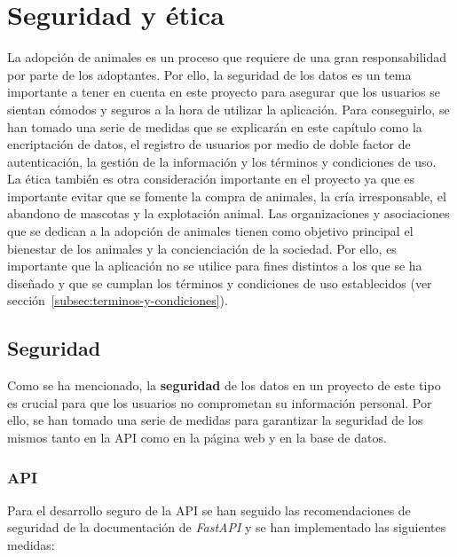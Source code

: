 \chapter{Seguridad y ética}\label{ch:seguridad-y-etica}

La adopción de animales es un proceso que requiere de una gran responsabilidad por parte de los adoptantes. Por ello,
la seguridad de los datos es un tema importante a tener en cuenta en este proyecto para asegurar que los usuarios
se sientan cómodos y seguros a la hora de utilizar la aplicación. Para conseguirlo, se han tomado una serie de medidas
que se explicarán en este capítulo como la encriptación de datos, el registro de usuarios por medio de doble
factor de autenticación, la gestión de la información y los términos y condiciones de uso. \\

La ética también es otra consideración importante en el proyecto ya que es importante evitar que se fomente
la compra de animales, la cría irresponsable, el abandono de mascotas y la explotación animal. Las organizaciones
y asociaciones que se dedican a la adopción de animales tienen como objetivo principal el bienestar de los animales
y la concienciación de la sociedad. Por ello, es importante que la aplicación no se utilice para fines distintos
a los que se ha diseñado y que se cumplan los términos y condiciones de uso establecidos (ver sección~\ref{subsec:terminos-y-condiciones}).

\section{Seguridad}\label{sec:seguridad}

Como se ha mencionado, la \textbf{seguridad} de los datos en un proyecto de este tipo es crucial para que los usuarios no
comprometan su información personal. Por ello, se han tomado una serie de medidas para garantizar la seguridad
de los mismos tanto en la API como en la página web y en la base de datos.

\subsection{API}\label{subsec:api}

Para el desarrollo seguro de la API se han seguido las recomendaciones de seguridad de la documentación de \textit{FastAPI}
y se han implementado las siguientes medidas:

